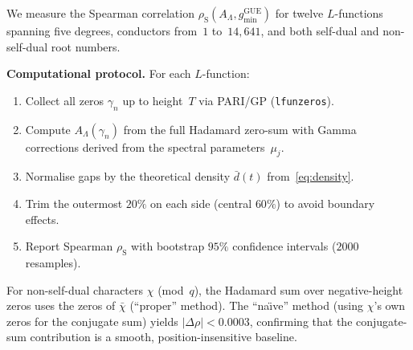 \documentclass[11pt, a4paper]{article}
\theoremstyle{plain}
\theoremstyle{definition}
\newcommand{\Lam}{\Lambda}
\DeclareMathOperator{\GUE}{GUE}
\begin{document}
We measure the Spearman correlation $\rho_{\mathrm{S}}(A_\Lam,
g_{\min}^{\GUE})$ for twelve $L$-functions spanning five degrees,
conductors from~$1$ to~$14{,}641$, and both self-dual and non-self-dual
root numbers.

\medskip\noindent\textbf{Computational protocol.}\;
For each $L$-function:
\begin{enumerate}
  \item Collect all zeros $\gamma_n$ up to height~$T$ via
        \textsc{PARI/GP} (\texttt{lfunzeros}).
  \item Compute $A_\Lam(\gamma_n)$ from the full Hadamard
        zero-sum with Gamma corrections derived from the spectral
        parameters~$\mu_j$.
  \item Normalise gaps by the theoretical density
        $\bar{d}(t)$ from~\eqref{eq:density}.
  \item Trim the outermost $20\%$ on each side (central $60\%$)
        to avoid boundary effects.
  \item Report Spearman $\rho_{\mathrm{S}}$ with bootstrap $95\%$
        confidence intervals ($2000$ resamples).
\end{enumerate}

For non-self-dual characters $\chi$ (mod~$q$), the Hadamard sum
over negative-height zeros uses the zeros of $\bar{\chi}$
(``proper'' method).  The ``na\"{\i}ve'' method (using $\chi$'s own
zeros for the conjugate sum) yields $|\Delta\rho| < 0.0003$,
confirming that the conjugate-sum contribution is a smooth,
position-insensitive baseline.
\end{document}
